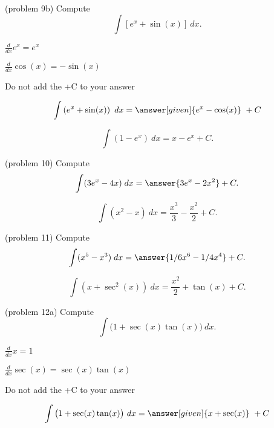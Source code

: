 \documentclass{ximera}
\begin{document}
\begin{problem}(problem 9b)
Compute
\[
\int \left[e^x + \sin(x) \right] \ dx.
\]

\begin{hint}
$\frac{d}{dx} e^x = e^x$
\end{hint}
\begin{hint}
$\frac{d}{dx} \cos(x) = -\sin(x)$
\end{hint}
\begin{hint}
\begin{center}
Do not add the +C to your answer
\end{center}
\end{hint}

\[
\int \left(e^x + \sin(x) \right) \ dx =
\answer[given]{e^x -\cos(x)} \ +  C
\]
\end{problem}


\begin{example}[example 10]
\[
\int \left(1 - e^x\right) \ dx = x - e^x + C.
\]
\end{example}

\begin{problem}(problem 10)
Compute
\[
\int (3e^x - 4x) \; dx = \answer{3e^x - 2x^2} + C.
\]
\end{problem}



\begin{example}[example 11]
\[
\int \left(x^2 - x\right) \ dx = \dfrac{x^3}{3} - \dfrac{x^2}{2} + C.
\]
\end{example}


\begin{problem}(problem 11)
Compute
\[
\int (x^5 - x^3) \; dx = \answer{1/6 x^6 - 1/4 x^4} + C.
\]
\end{problem}




\begin{example}[example 12]
\[
\int \left(x + \sec^2(x)\right) \ dx = \frac{x^2}{2} + \tan(x) + C.
\]
\end{example}

\begin{problem}(problem 12a)
Compute
\[
\int \big(1 + \sec(x)\tan(x) \big) \ dx.
\]

\begin{hint}
$\frac{d}{dx} x = 1$
\end{hint}
\begin{hint}
$\frac{d}{dx} \sec(x) = \sec(x)\tan(x)$
\end{hint}
\begin{hint}
\begin{center}
Do not add the +C to your answer
\end{center}
\end{hint}

\[
\int \big(1 + \sec(x)\tan(x) \big) \ dx =
\answer[given]{x + \sec(x)} \ +  C
\]
\end{problem}
\end{document}
